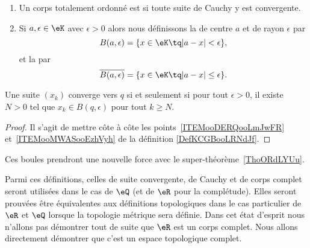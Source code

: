 \begin{definition}
\begin{enumerate}
        \item       \label{ITEMooKZZYooDaidGU}
            Un corps totalement ordonné est  si toute suite de Cauchy y est convergente.
        \item       \label{ITEMooMWASooEzhVyh}
            Si \( a,\epsilon\in \eK\) avec \( \epsilon>0\) alors nous définissons la  de centre \( a\) et de rayon \( \epsilon\) par
            \begin{equation}
                B(a,\epsilon)=\{ x\in \eK\tq | a-x |<\epsilon \},
            \end{equation}
            et la  par
            \begin{equation}
                \overline{ B(a,\epsilon) }=\{ x\in \eK\tq | a-x |\leq \epsilon \}.
            \end{equation}
    \end{enumerate}
\end{definition}

\begin{lemma}
    Une suite \( (x_k)\) converge vers \( q\) si et seulement si pour tout \( \epsilon>0\), il existe \( N>0\) tel que \( x_k\in B(q,\epsilon)\) pour tout \( k\geq N\).
\end{lemma}

\begin{proof}
    Il s'agit de mettre côte à côte les points~\ref{ITEMooDERQooLmJwFR} et~\ref{ITEMooMWASooEzhVyh} de la définition \ref{DefKCGBooLRNdJf}.
\end{proof}

\begin{normaltext}
    Ces boules prendront une nouvelle force avec le super-théorème~\ref{ThoORdLYUu}.
\end{normaltext}

Parmi ces définitions, celles de suite convergente, de Cauchy et de corps complet seront utilisées dans le cas de \( \eQ\) (et de \( \eR\) pour la complétude). Elles seront prouvées être équivalentes aux définitions topologiques dans le cas particulier de \( \eR\) et \( \eQ\) lorsque la topologie métrique sera définie. Dans cet état d'esprit nous n'allons pas démontrer tout de suite que \( \eR\) est un corps complet. Nous allons directement démontrer que c'est un espace topologique complet.

